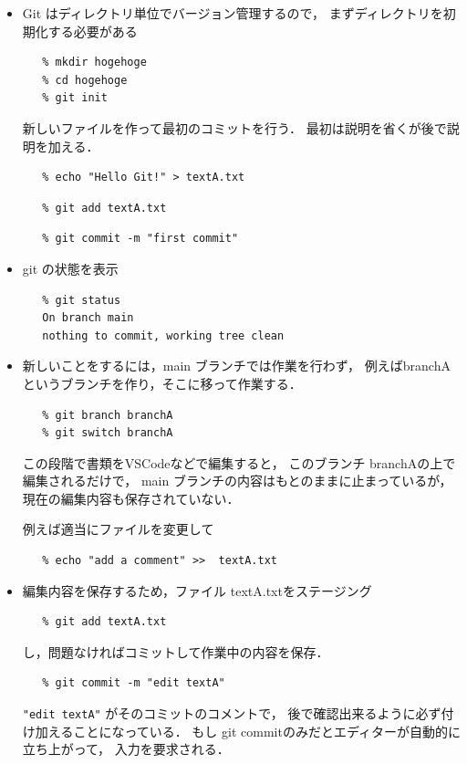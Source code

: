 \begin{itemize}
   \item
      Git はディレクトリ単位でバージョン管理するので，
      まずディレクトリを初期化する必要がある
\begin{verbatim}
   % mkdir hogehoge
   % cd hogehoge   
   % git init 
\end{verbatim}
      新しいファイルを作って最初のコミットを行う．
      最初は説明を省くが後で説明を加える．
\begin{verbatim}
   % echo "Hello Git!" > textA.txt
\end{verbatim}
\begin{verbatim}
   % git add textA.txt
\end{verbatim}
\begin{verbatim}
   % git commit -m "first commit"
\end{verbatim}

   \item
      git の状態を表示
\begin{verbatim}
   % git status 
   On branch main
   nothing to commit, working tree clean 
\end{verbatim}

   \item
      新しいことをするには，main ブランチでは作業を行わず，
      例えばbranchAというブランチを作り，そこに移って作業する．
\begin{verbatim}
   % git branch branchA
   % git switch branchA
\end{verbatim}
      この段階で書類をVSCodeなどで編集すると，
      このブランチ branchAの上で編集されるだけで，
      main ブランチの内容はもとのままに止まっているが，
      現在の編集内容も保存されていない．

      例えば適当にファイルを変更して
\begin{verbatim}
   % echo "add a comment" >>  textA.txt 
\end{verbatim}

   \item
      編集内容を保存するため，ファイル textA.txtをステージング
\begin{verbatim}
   % git add textA.txt 
\end{verbatim}

\noindent
      し，問題なければコミットして作業中の内容を保存．
\begin{verbatim}
   % git commit -m "edit textA"
\end{verbatim}
      \verb/"edit textA"/ がそのコミットのコメントで，
      後で確認出来るように必ず付け加えることになっている．
      もし git commitのみだとエディターが自動的に立ち上がって，
      入力を要求される．
      

\end{itemize}
